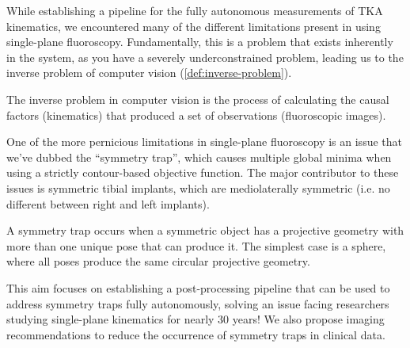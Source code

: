 While establishing a pipeline for the fully autonomous measurements of TKA kinematics, we encountered many of the different limitations present in using single-plane fluoroscopy. Fundamentally, this is a problem that exists inherently in the system, as you have a severely underconstrained problem, leading us to the inverse problem of computer vision (\cref{def:inverse-problem}).

\begin{mdframed}
	\begin{definition}
		The inverse problem in computer vision is the process of calculating the causal factors (kinematics) that produced a set of observations (fluoroscopic images).
		\label{def:inverse-problem}
	\end{definition}
\end{mdframed}

One of the more pernicious limitations in single-plane fluoroscopy is an issue that we've dubbed the ``symmetry trap'', which causes multiple global minima when using a strictly contour-based objective function. The major contributor to these issues is symmetric tibial implants, which are mediolaterally symmetric (i.e. no different between right and left implants).

\begin{mdframed}
	\begin{definition}
		A symmetry trap occurs when a symmetric object has a projective geometry with more than one unique pose that can produce it. The simplest case is a sphere, where all poses produce the same circular projective geometry.
	\end{definition}
\end{mdframed}

This aim focuses on establishing a post-processing pipeline that can be used to address symmetry traps fully autonomously, solving an issue facing researchers studying single-plane kinematics for nearly 30 years! We also propose imaging recommendations to reduce the occurrence of symmetry traps in clinical data.



